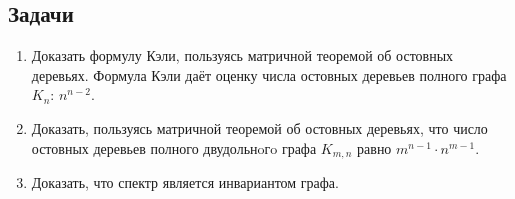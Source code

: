 \subsection{Задачи}
\begin{enumerate}
\item Доказать формулу Кэли, пользуясь матричной теоремой об остовных деревьях. Формула Кэли даёт оценку числа остовных деревьев полного графа $K_{n}$: $n^{n-2}$.
\item Доказать, пользуясь матричной теоремой об остовных деревьях, что число остовных деревьев полного двудольнoгo графа $K_{m,n}$ равно $m^{n-1}\cdot n^{m-1}$.
\item Доказать, что спектр является инвариантом графа.
\end{enumerate}
